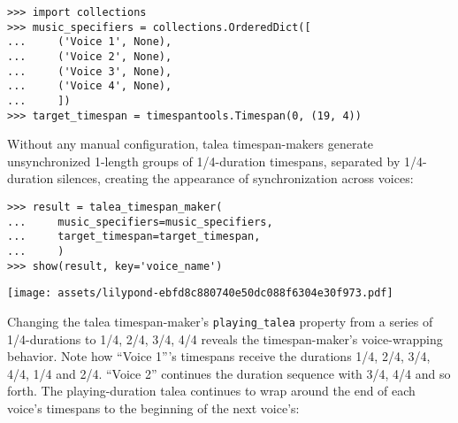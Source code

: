 \begin{singlespacing}
\vspace{-0.5\baselineskip}
\begin{lstlisting}
>>> import collections
>>> music_specifiers = collections.OrderedDict([
...     ('Voice 1', None),
...     ('Voice 2', None),
...     ('Voice 3', None),
...     ('Voice 4', None),
...     ])
>>> target_timespan = timespantools.Timespan(0, (19, 4))
\end{lstlisting}
\end{singlespacing}

\noindent Without any manual configuration, talea timespan-makers generate
unsynchronized 1-length groups of 1/4-duration timespans, separated by
1/4-duration silences, creating the appearance of synchronization across
voices:

\begin{comment}
<abjad>
result = talea_timespan_maker(
    music_specifiers=music_specifiers,
    target_timespan=target_timespan,
    )
show(result, key='voice_name')
</abjad>
\end{comment}

\begin{singlespacing}
\vspace{-0.5\baselineskip}
\begin{lstlisting}
>>> result = talea_timespan_maker(
...     music_specifiers=music_specifiers,
...     target_timespan=target_timespan,
...     )
>>> show(result, key='voice_name')
\end{lstlisting}
\noindent\texttt{[image: assets/lilypond-ebfd8c880740e50dc088f6304e30f973.pdf]}
\end{singlespacing}

\noindent Changing the talea timespan-maker's \texttt{playing\_talea} property
from a series of 1/4-durations to 1/4, 2/4, 3/4, 4/4 reveals the
timespan-maker's voice-wrapping behavior. Note how \enquote{Voice 1}'s
timespans receive the durations 1/4, 2/4, 3/4, 4/4, 1/4 and 2/4. \enquote{Voice
2} continues the duration sequence with 3/4, 4/4 and so forth. The
playing-duration talea continues to wrap around the end of each voice's
timespans to the beginning of the next voice's:

\begin{comment}
<abjad>
talea_timespan_maker = new(
    talea_timespan_maker,
    playing_talea=rhythmmakertools.Talea(
        counts=(1, 2, 3, 4),
        denominator=4,
        )
    )
result = talea_timespan_maker(
    music_specifiers=music_specifiers,
    target_timespan=target_timespan,
    )
show(result, key='voice_name')
</abjad>
\end{comment}

